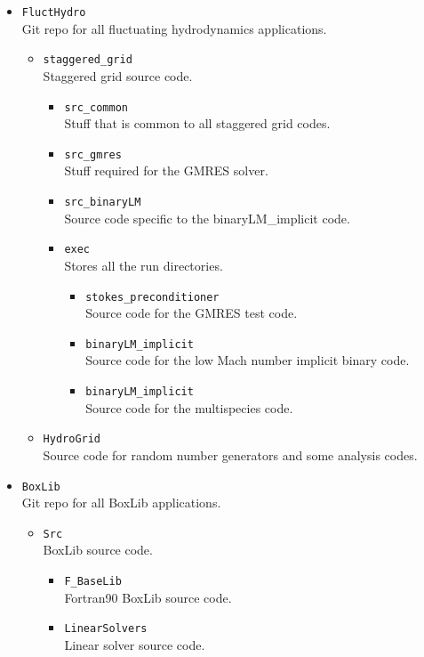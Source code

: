 \documentclass[final]{siamltex}
\begin{document}
\begin{itemize}
\item {\tt FluctHydro}\\
Git repo for all fluctuating hydrodynamics applications.
\begin{itemize}
\item {\tt staggered\_grid}\\
Staggered grid source code.
\begin{itemize}
\item {\tt src\_common}\\
Stuff that is common to all staggered grid codes.
\item {\tt src\_gmres}\\
Stuff required for the GMRES solver.
\item {\tt src\_binaryLM}\\
Source code specific to the binaryLM\_implicit code.
\item {\tt exec}\\
Stores all the run directories.
\begin{itemize}
\item {\tt stokes\_preconditioner}\\
Source code for the GMRES test code.
\item {\tt binaryLM\_implicit}\\
Source code for the low Mach number implicit binary code.
\item {\tt binaryLM\_implicit}\\
Source code for the multispecies code.
\end{itemize}
\end{itemize}
\item {\tt HydroGrid}\\
Source code for random number generators and some analysis codes.
\end{itemize}
\item {\tt BoxLib}\\
Git repo for all BoxLib applications.
\begin{itemize}
\item {\tt Src}\\
BoxLib source code.
\begin{itemize}
\item {\tt F\_BaseLib}\\
Fortran90 BoxLib source code.
\item {\tt LinearSolvers}\\
Linear solver source code.
\begin{itemize}

\end{itemize}
\end{itemize}
\end{itemize}
\end{itemize}
\end{document}
